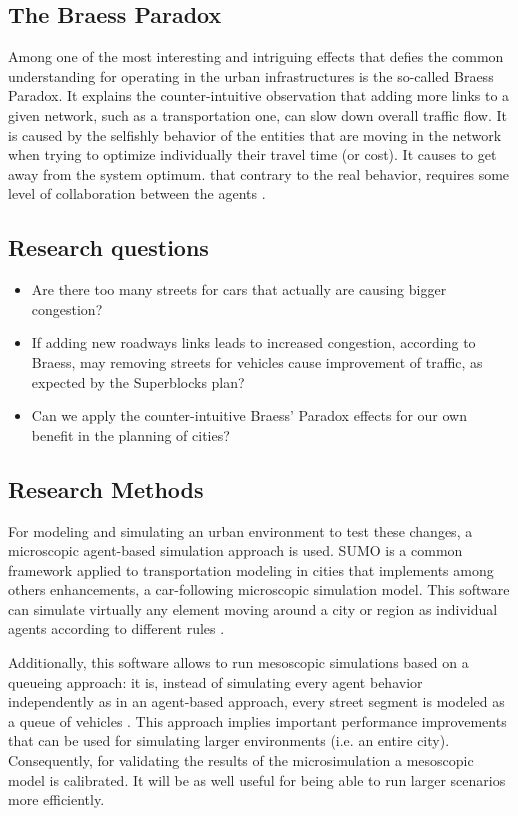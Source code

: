 \documentclass[11pt]{article}
\begin{document}
\subsection {The Braess Paradox}

Among one of the most interesting and intriguing effects that defies the common understanding for operating in the urban infrastructures is the so-called Braess Paradox. It explains the counter-intuitive observation that adding more links to a given network, such as a transportation one, can slow down overall traffic flow. It is caused by the selfishly behavior of the entities that are moving in the network when trying to optimize individually their travel time (or cost). It causes to get away from the system optimum. that contrary to the real behavior, requires some level of collaboration between the agents \citep{Braess1969}.

\subsection {Research questions}

\begin{itemize}
    \item Are there too many streets for cars that actually are causing bigger congestion?
    \item If adding new roadways links leads to increased congestion, according to Braess, may removing streets for vehicles cause improvement of traffic, as expected by the Superblocks plan?
    \item Can we apply the counter-intuitive Braess’ Paradox effects for our own benefit in the planning of cities?
\end{itemize}

\subsection {Research Methods}

For modeling and simulating an urban environment to test these changes, a microscopic agent-based simulation approach is used. SUMO is a common framework applied to transportation modeling in cities that implements among others enhancements, a car-following microscopic simulation model. This software can simulate virtually any element moving around a city or region as individual agents according to different rules \citep{Lopez2018}.

Additionally, this software allows to run mesoscopic simulations based on a queueing approach: it is, instead of simulating every agent behavior independently as in an agent-based approach, every street segment is modeled as a queue of vehicles \citep{Eissfeldt2004}. This approach implies important performance improvements that can be used for simulating larger environments (i.e. an entire city). Consequently, for validating the results of the microsimulation a mesoscopic model is calibrated. It will be as well useful for being able to run larger scenarios more efficiently. 
\end{document}
